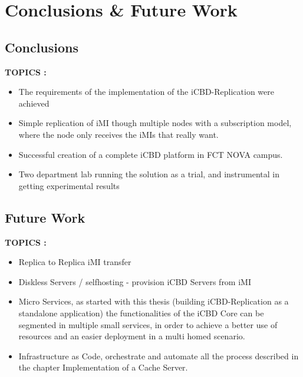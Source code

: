 \chapter{Conclusions \& Future Work}
\label{cha:conclusion}

\section{Conclusions}
\label{sec:conclusions}

\textbf{TOPICS :}
\begin{itemize}
	\item The requirements of the implementation of the iCBD-Replication were achieved 
	\item Simple replication of iMI though multiple nodes with a subscription model, where the node only receives the iMIs that really want.
	\item Successful creation of a complete iCBD platform in FCT NOVA campus.
	\item Two department lab running the solution as a trial, and instrumental in getting experimental results
\end{itemize}



\section{Future Work}
\label{sec:future_work}

\textbf{TOPICS :}
\begin{itemize}
	\item Replica to Replica iMI transfer
	\item Diskless Servers / selfhosting - provision iCBD Servers from iMI
	\item Micro Services, as started with this thesis (building iCBD-Replication as a standalone application) the functionalities of the iCBD Core can be segmented in multiple small services, in order to achieve a better use of resources and an easier deployment in a multi homed scenario.
	\item Infrastructure as Code, orchestrate and automate all the process described in the chapter Implementation of a Cache Server.
\end{itemize}





